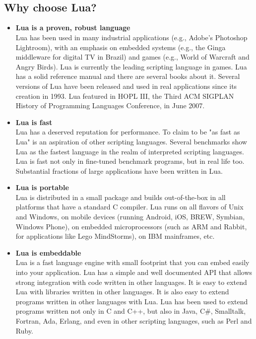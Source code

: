 \leavevmode\\\\

\subsection{Why choose Lua?}
\begin{itemize}
\item \textbf{Lua is a proven, robust language}\\
Lua has been used in many industrial applications (e.g., Adobe's Photoshop Lightroom), with an emphasis on embedded systems (e.g., the Ginga middleware for digital TV in Brazil) and games (e.g., World of Warcraft and Angry Birds). Lua is currently the leading scripting language in games. Lua has a solid reference manual and there are several books about it. Several versions of Lua have been released and used in real applications since its creation in 1993. Lua featured in HOPL III, the Third ACM SIGPLAN History of Programming Languages Conference, in June 2007. 
\item \textbf{Lua is fast}\\
Lua has a deserved reputation for performance. To claim to be "as fast as Lua" is an aspiration of other scripting languages. Several benchmarks show Lua as the fastest language in the realm of interpreted scripting languages. Lua is fast not only in fine-tuned benchmark programs, but in real life too. Substantial fractions of large applications have been written in Lua. 
\item \textbf{Lua is portable}\\
Lua is distributed in a small package and builds out-of-the-box in all platforms that have a standard C compiler. Lua runs on all flavors of Unix and Windows, on mobile devices (running Android, iOS, BREW, Symbian, Windows Phone), on embedded microprocessors (such as ARM and Rabbit, for applications like Lego MindStorms), on IBM mainframes, etc. 
\item \textbf{Lua is embeddable}\\
 Lua is a fast language engine with small footprint that you can embed easily into your application. Lua has a simple and well documented API that allows strong integration with code written in other languages. It is easy to extend Lua with libraries written in other languages. It is also easy to extend programs written in other languages with Lua. Lua has been used to extend programs written not only in C and C++, but also in Java, C\#, Smalltalk, Fortran, Ada, Erlang, and even in other scripting languages, such as Perl and Ruby. 

\end{itemize}
